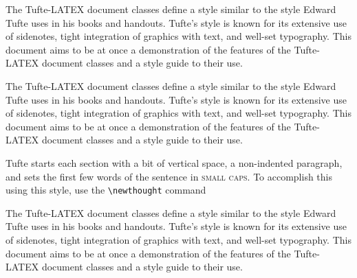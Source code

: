 The Tufte-LATEX document classes define a style similar to the style
Edward Tufte uses in his books and handouts. Tufte's style is known
for its extensive use of sidenotes, tight integration of graphics with
text, and well-set typography. This document aims to be at once a
demonstration of the features of the Tufte-LATEX document classes
and a style guide to their use.

The Tufte-LATEX document classes define a style similar to the style
Edward Tufte uses in his books and handouts. Tufte's style is known
for its extensive use of sidenotes, tight integration of graphics with
text, and well-set typography. This document aims to be at once a
demonstration of the features of the Tufte-LATEX document classes
and a style guide to their use.

 Tufte
starts each section with a bit of vertical space, a non-indented paragraph,
and sets the first few words of the sentence in \textsc{small caps}.  To
accomplish this using this style, use the \Verb|\newthought| command

The Tufte-LATEX document classes define a style similar to the style
Edward Tufte uses in his books and handouts. Tufte's style is known
for its extensive use of sidenotes, tight integration of graphics with
text, and well-set typography. This document aims to be at once a
demonstration of the features of the Tufte-LATEX document classes
and a style guide to their use.


